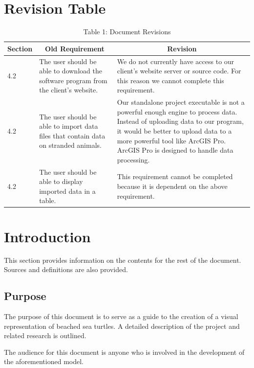 \documentclass[onecolumn, draftclsnofoot,10pt, compsoc]{IEEEtran}
\begin{document}
\begin{singlespace}

\section{Revision Table}
\begin{table}[H]
\begin{center}
 \begin{tabular}{ |p{}|p{}|p{}|} 
 \hline
 \multicolumn{1}{|c|}{\textbf{Section}} 
 & 
\multicolumn{1}{|c|}{\textbf{Old Requirement}}  & 
\multicolumn{1}{|c|}{\textbf{Revision}}\\
 \hline
 
4.2 & The user should be able to download the software program from the client's website. &  We do not currently have access to our client's website server or source code. For this reason we cannot complete this requirement. \\
 \hline
 
 4.2 & The user should be able to import data files that contain data on stranded animals. & Our standalone project executable is not a powerful enough engine to process data. Instead of uploading data to our program, it would be better to upload data to a more powerful tool like ArcGIS Pro. ArcGIS Pro is designed to handle data processing.\\
 \hline
 
  4.2 & The user should be able to display imported data in a table. & This requirement cannot be completed because it is dependent on the above requirement.\\
 \hline


\end{tabular}
\caption{Table 1: Document Revisions}
\label{table:1}
\end{center}
\end{table}


\section{Introduction}
This section provides information on the contents for the rest of the document.  Sources and definitions are also provided.
\subsection{Purpose}
The purpose of this document is to serve as a guide to the creation of a visual representation of beached sea turtles. A detailed description of the project and related research is outlined. \newline 
\par \noindent The audience for this document is anyone who is involved in the development of the aforementioned model.

\end{singlespace}
\end{document}
